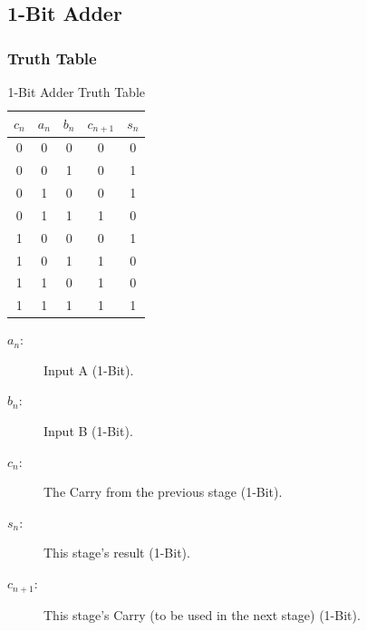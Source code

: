 \documentclass{article}
\begin{document}
\subsection{1-Bit Adder}

\subsubsection{Truth Table}

\begin{table}[H]
    \centering
    \begin{tabular}{|c|c|c||c|c|} \hline 
         $c_n$&  $a_n$&  $b_n$&  $c_{n+1}$& $s_n$\\ \hline \hline 
         0&  0&  0&  0& 0\\ \hline
         0&  0&  1&  0& 1\\ \hline 
         0&  1&  0&  0& 1\\ \hline 
         0&  1&  1&  1& 0\\ \hline 
         1&  0&  0&  0& 1\\ \hline 
         1&  0&  1&  1& 0\\ \hline 
         1&  1&  0&  1& 0\\ \hline 
         1&  1&  1&  1& 1\\ \hline
    \end{tabular}
    \caption{1-Bit Adder Truth Table}
    \label{tab:1Bit Adder Truth Table}
\end{table}

{
\small
\begin{description}
  \item[$a_n$:] Input A (1-Bit).
  \item[$b_n$:] Input B (1-Bit).
  \item[$c_n$:] The Carry from the previous stage (1-Bit).
  \item[$s_n$:] This stage's result (1-Bit).
  \item[$c_{n+1}$:] This stage's Carry (to be used in the next stage) (1-Bit).
\end{description}
}
\end{document}
